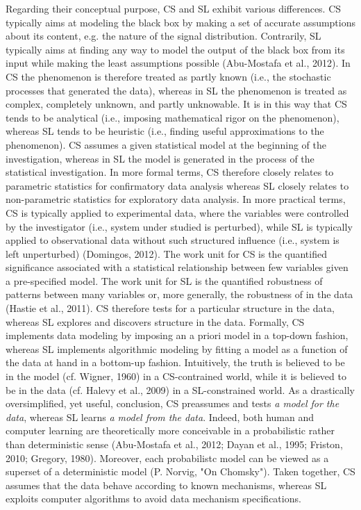 \documentclass[authoryear,review,3p]{elsarticle}
\begin{document}
Regarding their conceptual purpose, CS and SL exhibit various differences.
CS typically aims at modeling the black box by making a set of
accurate assumptions about its content,
e.g. the nature of the signal distribution.
Contrarily, SL typically aims at finding any way to model
the output of the black box from its input
while making the least assumptions possible (Abu-Mostafa et al., 2012).
In CS the phenomenon is therefore treated as partly known
(i.e., the stochastic processes that generated the data),
whereas in SL the phenomenon is treated as complex,
completely unknown, and partly unknowable.
It is in this way that CS tends to be
analytical
(i.e., imposing mathematical rigor on the phenomenon),
whereas SL tends to be
heuristic
(i.e., finding useful approximations to the phenomenon).
CS assumes a given statistical model at the beginning of the investigation,
whereas in SL the model is
generated in the process of the statistical investigation.
In more formal terms,
CS therefore closely relates to parametric statistics
for confirmatory data analysis
whereas SL closely relates to non-parametric statistics
for exploratory data analysis.
In more practical terms, CS is typically applied to experimental data,
where the variables were controlled by the investigator
(i.e., system under studied is perturbed),
while SL is typically applied to observational
data without such structured influence
(i.e., system is left unperturbed) (Domingos, 2012).
The work unit for CS is the quantified
significance associated with a statistical
relationship between few variables given a pre-specified model.
The work unit for SL is the quantified robustness of patterns
between many variables or, more generally,
the robustness of  in the data (Hastie et al., 2011).
CS therefore tests for a particular structure in the data,
whereas SL explores and discovers structure in the data.
Formally, CS implements data modeling by
imposing an a priori model in a top-down fashion,
whereas SL implements algorithmic modeling by fitting
a model as a function of the data at hand in a bottom-up fashion.
%
Intuitively, the truth is believed
to be in the model (cf. Wigner, 1960) in a CS-contrained world,
while it is believed to be in the data
(cf. Halevy et al., 2009) in a SL-constrained world.
As a drastically oversimplified, yet useful, conclusion,
CS preassumes and tests \textit{a model for the data},
whereas SL learns \textit{a model from the data}.
%
Indeed,
both human and computer learning are theoretically
more conceivable in a probabilistic rather than
deterministic sense
(Abu-Mostafa et al., 2012; Dayan et al., 1995; Friston, 2010; Gregory, 1980).
Moreover, each probabilistc model can be viewed as a superset
of a deterministic model (P. Norvig, "On Chomsky").
%
Taken together,
CS assumes that the data behave according to known mechanisms,
whereas SL exploits
computer algorithms to avoid data mechanism specifications.
\end{document}
